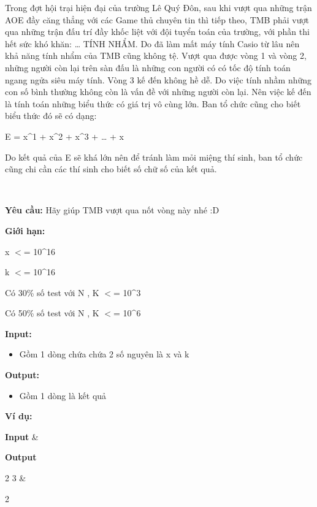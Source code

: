 

Trong đợt hội trại hiện đại của trường Lê Quý Đôn, sau khi vượt qua những trận AOE đầy căng thẳng với các Game thủ chuyên tin thì tiếp theo, TMB phải vượt qua những trận đấu trí đầy khốc liệt với đội tuyển toán của trường, với phần thi hết sức khó khăn: … TÍNH NHẨM. Do đã làm mất máy tính Casio từ lâu nên khả năng tính nhẩm của TMB cũng không tệ. Vượt qua được vòng 1 và vòng 2, những người còn lại trên sàn đấu là những con người có có tốc độ tính toán ngang ngửa siêu máy tính. Vòng 3 kế đến không hề dễ. Do việc tính nhầm những con số bình thường không còn là vấn đề với những người còn lại. Nên việc kế đến là tính toán những biểu thức có giá trị vô cùng lớn. Ban tổ chức cũng cho biết biểu thức đó sẽ có dạng:

E = x\textasciicircum1 + x\textasciicircum2 + x\textasciicircum3 + … + x\textasciicircumk

Do kết quả của E sẽ khá lớn nên để tránh làm mỏi miệng thí sinh, ban tổ chức cũng chi cần các thí sinh cho biết số chữ số của kết quả.

 

\textbf{Yêu cầu: }Hãy giúp TMB vượt qua nốt vòng này nhé :D

\textbf{Giới hạn:}

x $<$= 10\textasciicircum16

k $<$= 10\textasciicircum16

Có 30\% số test với N , K $<$= 10\textasciicircum3

Có 50\% số test với N , K $<$= 10\textasciicircum6

\textbf{Input:}
\begin{itemize}
	\item 

Gồm 1  dòng chứa chứa 2 số nguyên là  x và k
\end{itemize}

\textbf{Output:}
\begin{itemize}
	\item 

Gồm 1 dòng là  kết quả
\end{itemize}

\textbf{Ví dụ:}
\begin{tabular}\hline 


\textbf{Input} & 

\textbf{Output}  
\hline


2 3 & 

2  
\hline

\end{tabular}
